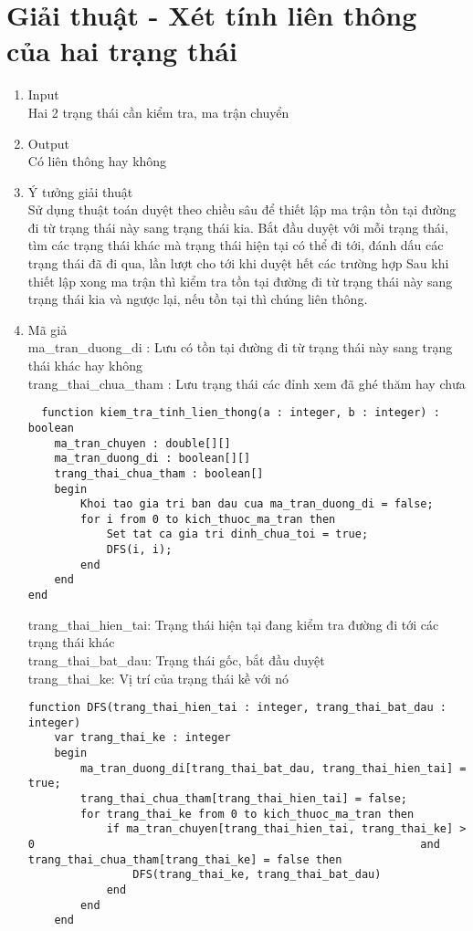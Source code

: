 \section{Giải thuật - Xét tính liên thông của hai trạng thái}
	\begin{enumerate}
  		\item Input \\
  			Hai 2 trạng thái cần kiểm tra, ma trận chuyển
  		\item Output \\
  			Có liên thông hay không
  		\item Ý tưởng giải thuật \\
  			Sử dụng thuật toán duyệt theo chiều sâu để thiết lập ma trận tồn tại đường đi từ trạng thái này 				sang trạng thái kia.
			Bắt đầu duyệt với mỗi trạng thái, tìm các trạng thái khác mà trạng thái hiện tại có thể đi tới, 				đánh dấu các trạng thái đã đi qua, lần lượt cho tới khi duyệt hết các trường hợp
			Sau khi thiết lập xong ma trận thì kiểm tra tồn tại đường đi từ trạng thái này sang trạng thái 					kia và ngược lại, nếu tồn tại thì chúng liên thông.
  		\item Mã giả \\
			ma\_tran\_duong\_di  : Lưu có tồn tại đường đi từ trạng thái này sang trạng thái khác hay không \\  
  			trang\_thai\_chua\_tham : Lưu trạng thái các đỉnh xem đã ghé thăm hay chưa	
  			\begin{lstlisting}
  function kiem_tra_tinh_lien_thong(a : integer, b : integer) : boolean
	ma_tran_chuyen : double[][]
	ma_tran_duong_di : boolean[][]
	trang_thai_chua_tham : boolean[]
	begin
		Khoi tao gia tri ban dau cua ma_tran_duong_di = false;
		for i from 0 to kich_thuoc_ma_tran then
			Set tat ca gia tri dinh_chua_toi = true;
			DFS(i, i);
		end	
	end
end
  			\end{lstlisting}
  			
  		trang\_thai\_hien\_tai: Trạng thái hiện tại đang kiểm tra đường đi tới các trạng thái khác \\
		trang\_thai\_bat\_dau: Trạng thái gốc, bắt đầu duyệt \\
		trang\_thai\_ke: Vị trí của trạng thái kề với nó \\
		\begin{lstlisting}
function DFS(trang_thai_hien_tai : integer, trang_thai_bat_dau : integer)
	var trang_thai_ke : integer
	begin
		ma_tran_duong_di[trang_thai_bat_dau, trang_thai_hien_tai] = true;
		trang_thai_chua_tham[trang_thai_hien_tai] = false;
		for trang_thai_ke from 0 to kich_thuoc_ma_tran then
			if ma_tran_chuyen[trang_thai_hien_tai, trang_thai_ke] > 0		 													and trang_thai_chua_tham[trang_thai_ke] = false then
				DFS(trang_thai_ke, trang_thai_bat_dau)
			end
		end
	end
		\end{lstlisting}
	\end{enumerate}



